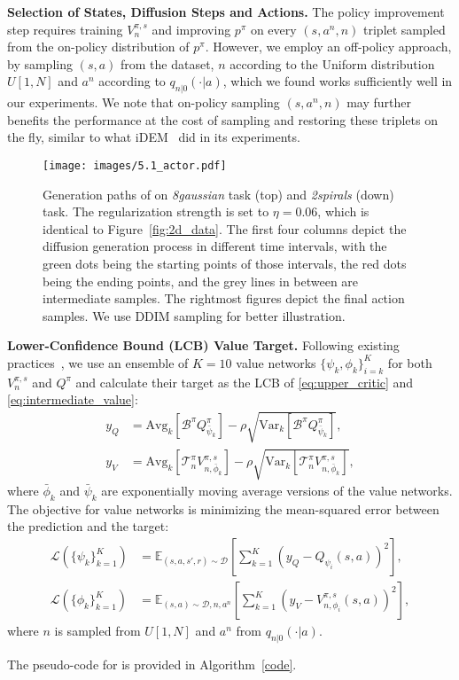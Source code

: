 \textbf{Selection of States, Diffusion Steps and Actions. }The policy improvement step requires training $V^{\pi,s}_n$ and improving $p^\pi$ on every $(s, a^n, n)$ triplet sampled from the on-policy distribution of $p^\pi$. However, we employ an off-policy approach, by sampling $(s, a)$ from the dataset, $n$ according to the Uniform distribution $U[1, N]$ and $a^n$ according to $q_{n|0}(\cdot|a)$, which we found works sufficiently well in our experiments. We note that on-policy sampling $(s, a^n, n)$ may further benefits the performance at the cost of sampling and restoring these triplets on the fly, similar to what iDEM~\citep{idem} did in its experiments. 

\begin{figure*}
    \centering
    \texttt{[image: images/5.1\_actor.pdf]}
    \caption{Generation paths of \algbb on \textit{8gaussian} task (top) and \textit{2spirals} (down) task. The regularization strength is set to $\eta=0.06$, which is identical to Figure~\ref{fig:2d_data}. The first four columns depict the diffusion generation process in different time intervals, with the green dots being the starting points of those intervals, the red dots being the ending points, and the grey lines in between are intermediate samples. The rightmost figures depict the final action samples. We use DDIM sampling for better illustration.}\label{fig:2d_actor}
\end{figure*}

\textbf{Lower-Confidence Bound (LCB) Value Target. }Following existing practices~\citep{dpqe,dac}, we use an ensemble of $K=10$ value networks $\{\psi_k, \phi_k\}_{i=k}^{K}$ for both $V^{\pi,s}_{n}$ and $Q^\pi$ and calculate their target as the LCB of \eqref{eq:upper_critic} and \eqref{eq:intermediate_value}:
\begin{equation}
\begin{aligned}
    y_Q&=\mathrm{Avg}_k[\mathcal{B}^\pi Q^\pi_{\bar{\psi}_k}]-\rho \sqrt{\mathrm{Var}_k[\mathcal{B}^\pi Q^\pi_{\bar{\psi}_k}]},\\
    y_V&=\mathrm{Avg}_k[\mathcal{T}_n^\pi V^{\pi,s}_{n,\bar{\phi}_k}]-\rho \sqrt{\mathrm{Var}_k[\mathcal{T}_n^\pi V^{\pi,s}_{n,\bar{\phi}_k}]},
\end{aligned}
\end{equation}
where $\bar{\phi}_k$ and $\bar{\psi}_k$ are exponentially moving average versions of the value networks. The objective for value networks is minimizing the mean-squared error between the prediction and the target:
\begin{equation}\label{eq:critic_loss}
    \begin{aligned}
        \mathcal{L}(\{\psi_k\}_{k=1}^{K})&=\mathbb{E}_{(s, a, s',r)\sim\mathcal{D}}\left[\sum_{k=1}^K(y_Q - Q_{\psi_i}(s, a))^2\right],\\
        \mathcal{L}(\{\phi_k\}_{k=1}^{K})&=\mathbb{E}_{(s, a)\sim\mathcal{D}, n,a^n}\left[\sum_{k=1}^K(y_V - V^{\pi,s}_{n,\phi_i}(s, a))^2\right],
    \end{aligned}
\end{equation}
where $n$ is sampled from $U[1, N]$ and $a^n$ from $q_{n|0}(\cdot|a)$. 

The pseudo-code for \algbb is provided in Algorithm~\ref{code}.
